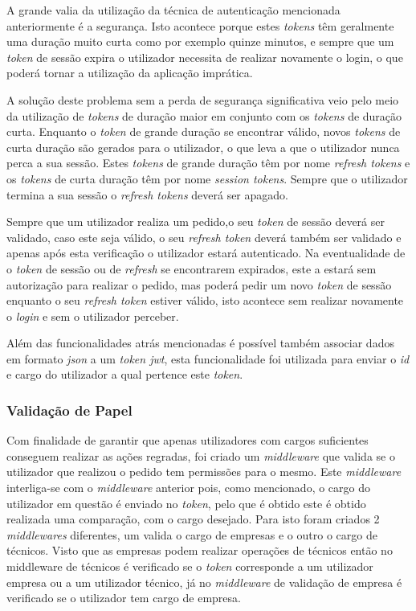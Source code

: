 A grande valia da utilização da técnica de autenticação mencionada anteriormente é a segurança. Isto acontece porque estes \textit{tokens} têm geralmente uma duração muito curta como por exemplo quinze minutos, e sempre que um \textit{token} de sessão expira o utilizador necessita de realizar novamente o login, o que poderá tornar a utilização da aplicação imprática.

A solução deste problema sem a perda de segurança significativa veio pelo meio da utilização de \textit{tokens} de duração maior em conjunto com os \textit{tokens} de duração curta. Enquanto o \textit{token} de grande duração se encontrar válido, novos \textit{tokens} de curta duração são gerados para o utilizador, o que leva a que o utilizador nunca perca a sua sessão. Estes \textit{tokens} de grande duração têm por nome \textit{refresh tokens} e os \textit{tokens} de curta duração têm por nome \textit{session tokens}. Sempre que o utilizador termina a sua sessão o \textit{refresh tokens} deverá ser apagado.

Sempre que um utilizador realiza um pedido,o seu \textit{token} de sessão deverá ser validado, caso este seja válido, o seu \textit{refresh token} deverá também ser validado e apenas após esta verificação o utilizador estará autenticado. Na eventualidade de o \textit{token} de sessão ou de \textit{refresh} se encontrarem expirados, este a estará sem autorização para realizar o pedido, mas poderá pedir um novo \textit{token} de sessão enquanto o seu \textit{refresh token} estiver válido, isto acontece sem realizar novamente o \textit{login} e sem o utilizador perceber.

 Além das funcionalidades atrás mencionadas é possível também associar dados em formato \textit{json} a um \textit{token jwt}, esta funcionalidade foi utilizada para enviar o \textit{id} e cargo do utilizador a qual pertence este \textit{token}.

 \newpage

\subsubsection{Validação de Papel}

Com finalidade de garantir que apenas utilizadores com cargos suficientes conseguem realizar as ações regradas, foi criado um \textit{middleware} que valida se o utilizador que realizou o pedido tem permissões para o mesmo. Este \textit{middleware} interliga-se com o \textit{middleware} anterior pois, como mencionado, o cargo do utilizador em questão é enviado no \textit{token}, pelo que é obtido este é obtido realizada uma comparação, com o cargo desejado. Para isto foram criados 2 \textit{middlewares} diferentes, um valida o cargo de empresas e o outro o cargo de técnicos. Visto que as empresas podem realizar operações de técnicos então no middleware de técnicos é verificado se o \textit{token} corresponde a um utilizador empresa ou a um utilizador técnico, já no \textit{middleware} de validação de empresa é verificado se o utilizador tem cargo de empresa.
